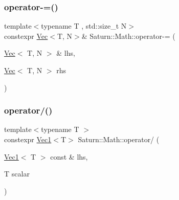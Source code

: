 \mbox{\label{namespace_saturn_1_1_math_aa9f21d7488fefb007e726e88369a6622}} 
\subsubsection{\texorpdfstring{operator-\/=()}{operator-=()}}
{\footnotesize\ttfamily template$<$typename T , std\+::size\+\_\+t N$>$ \\
constexpr \mbox{\hyperlink{class_saturn_1_1_math_1_1_vec}{Vec}}$<$T, N$>$\& Saturn\+::\+Math\+::operator-\/= (\begin{DoxyParamCaption}\item[{\mbox{\hyperlink{class_saturn_1_1_math_1_1_vec}{Vec}}$<$ T, N $>$ \&}]{lhs,  }\item[{\mbox{\hyperlink{class_saturn_1_1_math_1_1_vec}{Vec}}$<$ T, N $>$}]{rhs }\end{DoxyParamCaption})}

\mbox{\label{namespace_saturn_1_1_math_a58c8caefb06db356a2881414badfea9a}} 
\subsubsection{\texorpdfstring{operator/()}{operator/()}\hspace{0.1cm}{\footnotesize\ttfamily [1/4]}}
{\footnotesize\ttfamily template$<$typename T $>$ \\
constexpr \mbox{\hyperlink{namespace_saturn_1_1_math_acae4f808f0c3284d0b60ee1ac720deaa}{Vec1}}$<$T$>$ Saturn\+::\+Math\+::operator/ (\begin{DoxyParamCaption}\item[{\mbox{\hyperlink{namespace_saturn_1_1_math_acae4f808f0c3284d0b60ee1ac720deaa}{Vec1}}$<$ T $>$ const \&}]{lhs,  }\item[{T}]{scalar }\end{DoxyParamCaption})}

\mbox{\label{namespace_saturn_1_1_math_a477288f20d2a6b277a192eb37ec502b7}} 
